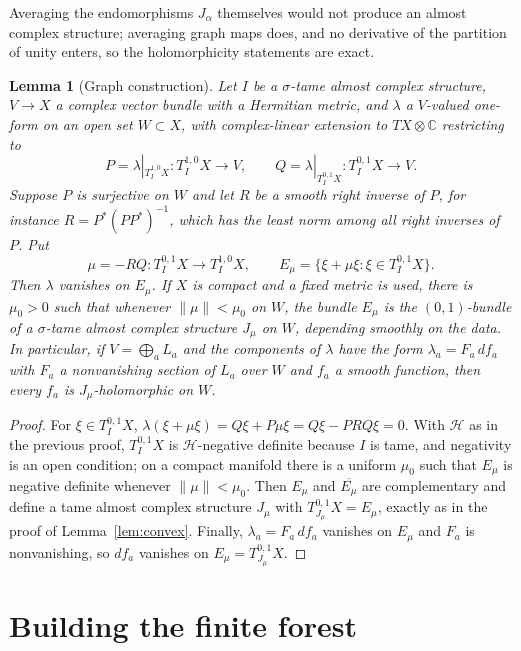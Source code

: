\documentclass[11pt]{article}
\newtheorem{lemma}[theorem]{Lemma}
\theoremstyle{remark}
\newcommand{\C}{\mathbb C}
\begin{document}
Averaging the endomorphisms $J_\alpha$ themselves would not produce an
almost complex structure; averaging graph maps does, and no derivative
of the partition of unity enters, so the holomorphicity statements are
exact.

\begin{lemma}[Graph construction]\label{lem:graph}
Let $I$ be a $\sigma$-tame almost complex structure, $V\to X$ a complex
vector bundle with a Hermitian metric, and $\lambda$ a $V$-valued
one-form on an open set $W\subset X$, with complex-linear extension to
$TX\otimes\C$ restricting to
\[
 P=\lambda|_{T^{1,0}_IX}\colon T^{1,0}_IX\to V,\qquad
 Q=\lambda|_{T^{0,1}_IX}\colon T^{0,1}_IX\to V .
\]
Suppose $P$ is surjective on $W$ and let $R$ be a smooth right inverse
of $P$, for instance $R=P^*(PP^*)^{-1}$, which has the least norm among
all right inverses of $P$. Put
\begin{equation}\label{eq:graph}
 \mu=-RQ\colon T^{0,1}_IX\to T^{1,0}_IX,\qquad
 E_\mu=\{\xi+\mu\xi:\xi\in T^{0,1}_IX\}.
\end{equation}
Then $\lambda$ vanishes on $E_\mu$. If $X$ is compact and a fixed
metric is used, there is $\mu_0>0$ such that whenever
$\lVert\mu\rVert<\mu_0$ on $W$, the bundle $E_\mu$ is the $(0,1)$-bundle
of a $\sigma$-tame almost complex structure $J_\mu$ on $W$, depending
smoothly on the data. In particular, if $V=\bigoplus_aL_a$ and the
components of $\lambda$ have the form $\lambda_a=F_a\,df_a$ with $F_a$
a nonvanishing section of $L_a$ over $W$ and $f_a$ a smooth function,
then every $f_a$ is $J_\mu$-holomorphic on $W$.
\end{lemma}

\begin{proof}
For $\xi\in T^{0,1}_IX$, $\lambda(\xi+\mu\xi)=Q\xi+P\mu\xi=Q\xi-PRQ\xi=0$.
With $\mathcal H$ as in the previous proof, $T^{0,1}_IX$ is
$\mathcal H$-negative definite because $I$ is tame, and negativity is
an open condition; on a compact manifold there is a uniform $\mu_0$
such that $E_\mu$ is negative definite whenever $\lVert\mu\rVert<\mu_0$.
Then $E_\mu$ and $\overline{E_\mu}$ are complementary and define a
tame almost complex structure $J_\mu$ with $T^{0,1}_{J_\mu}X=E_\mu$,
exactly as in the proof of Lemma~\ref{lem:convex}. Finally,
$\lambda_a=F_a\,df_a$ vanishes on $E_\mu$ and $F_a$ is nonvanishing,
so $df_a$ vanishes on $E_\mu=T^{0,1}_{J_\mu}X$.
\end{proof}


\section{Building the finite forest}\label{sec:forest}
\end{document}
